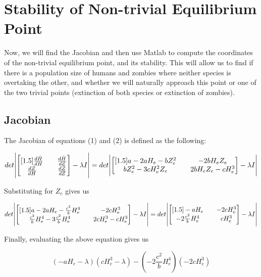 \documentclass[11pt]{article}
\begin{document}
\section{ Stability of Non-trivial Equilibrium Point}
Now, we will find the Jacobian and then use Matlab to compute the coordinates of the non-trivial equilibrium point, and its stability. This will allow us to find if there is a population size of humans and zombies where neither species is overtaking the other, and whether we will naturally approach this point or one of the two trivial points (extinction of both species or extinction of zombies).

\subsection{Jacobian}
The Jacobian of equations (1) and (2) is defined as the following:

\[
det \abs{
\begin{bmatrix}[1.5]
\frac{d \dot{H}}{dH} && \frac{ d \dot{H} }{ dZ} \\
\frac{d \dot{Z}}{dH} && \frac{ d \dot{Z} }{ dZ} \\
\end{bmatrix} 
 - \lambda I}
 =
 det \abs{
\begin{bmatrix}[1.5]
a - 2a H_e - b Z_e^2 && -2b H_e Z_e \\
b Z_e^2 - 3c H_e^2 Z_e && 2b H_e Z_e - c H_e^3 \\
\end{bmatrix} 
 - \lambda I}
\]

Substituting for $Z_e$ gives us

\begin{equation}
det \abs{
\begin{bmatrix}[1.5]
a - 2aH_e - \frac{c^2}{b}H_e^4 && -2cH_e^3 \\
\frac{c^2}{b}H_e^4 - 3 \frac{c^2}{b}H_e^4&& 2cH_e^3 - cH_e^3 \\
\end{bmatrix} 
 - \lambda I}
 =
 det \abs{
\begin{bmatrix}[1.5]
-aH_e && -2cH_e^3 \\
-2 \frac{c^2}{b} H_e^4 && cH_e^3 \\
\end{bmatrix} 
 - \lambda I}
\end{equation}

Finally, evaluating the above equation gives us

\[
(-aH_e - \lambda)(cH_e^3 - \lambda) - (-2 \frac{c^2}{b} H_e^4)(-2cH_e^3)
\]
\end{document}
